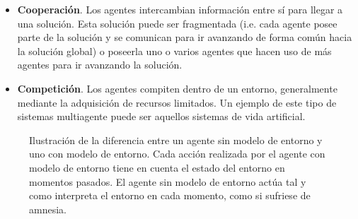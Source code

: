 \begin{itemize}
	\item \textbf{Cooperación}. Los agentes intercambian información entre sí para llegar a una solución. Esta solución puede ser fragmentada (i.e. cada agente posee parte de la solución y se comunican para ir avanzando de forma común hacia la solución global) o poseerla uno o varios agentes que hacen uso de más agentes para ir avanzando la solución.
	\item \textbf{Competición}. Los agentes compiten dentro de un entorno, generalmente mediante la adquisición de recursos limitados. Un ejemplo de este tipo de sistemas multiagente puede ser aquellos sistemas de vida artificial.
\end{itemize}

\begin{figure}
	\caption{Ilustración de la diferencia entre un agente sin modelo de entorno y uno con modelo de entorno. Cada acción realizada por el agente con modelo de entorno tiene en cuenta el estado del entorno en momentos pasados. El agente sin modelo de entorno actúa tal y como interpreta el entorno en cada momento, como si sufriese de amnesia.}
	\label{fig:communication-between-agents-in-mass}
\end{figure}

